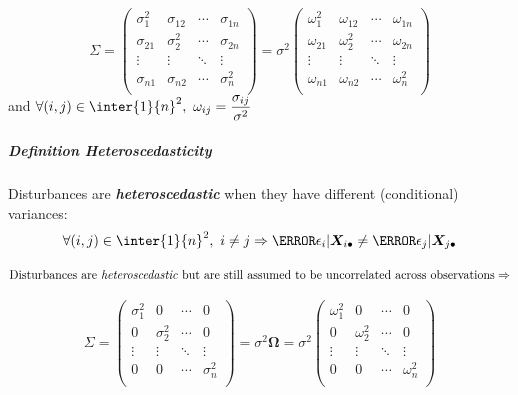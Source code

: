 \begin{equation*}
	\Sigma=
	\begin{pmatrix}
		\sigma_{1}^{2} & \sigma_{12} & \cdots & \sigma_{1n}\\
		\sigma_{21} & \sigma_{2}^{2} & \cdots & \sigma_{2n}\\
		\vdots & \vdots & \ddots & \vdots\\
		\sigma_{n1} & \sigma_{n2} & \cdots & \sigma_{n}^{2}\\
	\end{pmatrix}
= \sigma^{2}
	\begin{pmatrix}
		\omega_{1}^{2} & \omega_{12} & \cdots & \omega_{1n}\\
		\omega_{21} & \omega_{2}^{2} & \cdots & \omega_{2n}\\
		\vdots & \vdots & \ddots & \vdots\\
		\omega_{n1} & \omega_{n2} & \cdots & \omega_{n}^{2}\\
	\end{pmatrix}
\end{equation*}
and $\forall(i,j)\in\inter{1}{n}^{2},~\omega_{ij}=\dfrac{\sigma_{ij}}{\sigma^{2}}$
\subparagraph{Definition Heteroscedasticity}
Disturbances are \emph{\textbf{heteroscedastic}} when they have different (conditional) 
variances:
$$\forall (i,j)\in\inter{1}{n}^{2},~i\neq j\Rightarrow \V{\epsilon_{i}|
\bm{X}_{i\bullet}}\neq\V{\epsilon_{j}|\bm{X}_{j\bullet}}$$

$$ \text{Disturbances are \emph{heteroscedastic} but are still assumed to be uncorrelated across
observations}\Rightarrow $$
\begin{center}
\begin{equation*}
	\Sigma=
	\begin{pmatrix}
		\sigma_{1}^{2} & 0 & \cdots & 0\\
		0 & \sigma_{2}^{2} & \cdots & 0\\
		\vdots & \vdots & \ddots & \vdots\\
		0 & 0 & \cdots & \sigma_{n}^{2}\\
	\end{pmatrix}
	= \sigma^{2}\bm{\Omega}=\sigma^{2}
	\begin{pmatrix}
		\omega_{1}^{2} & 0 & \cdots & 0\\
		0 & \omega_{2}^{2} & \cdots & 0\\
		\vdots & \vdots & \ddots & \vdots\\
		0 & 0 & \cdots & \omega_{n}^{2}\\
	\end{pmatrix}
\end{equation*}
\end{center}



